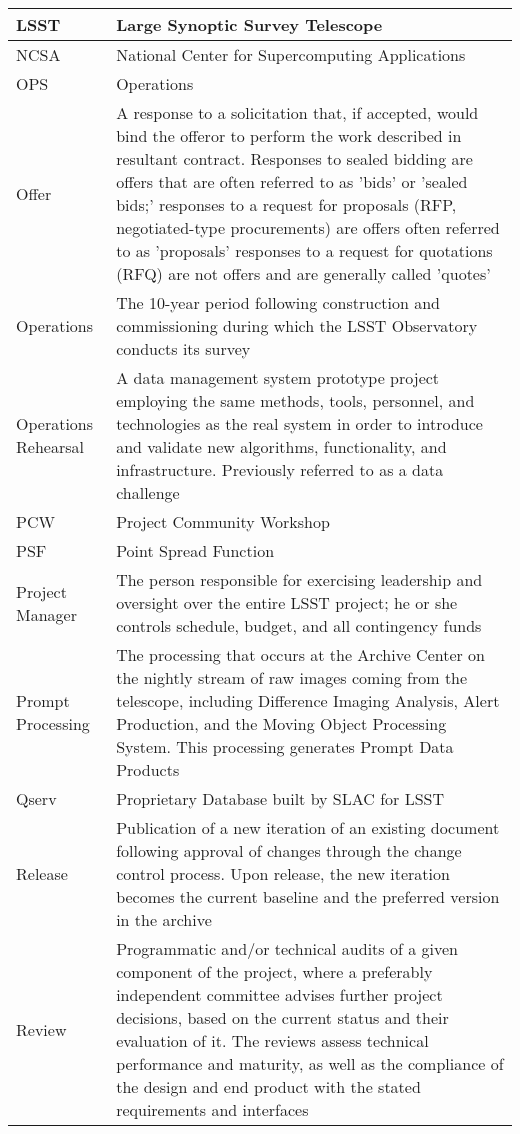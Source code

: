 \begin{longtable}{|p{}|p{}|}
LSST & Large Synoptic Survey Telescope \\\hline
NCSA & National Center for Supercomputing Applications \\\hline
OPS & Operations \\\hline
Offer & A response to a solicitation that, if accepted, would bind the offeror to perform the work described in resultant contract. Responses to sealed bidding are offers that are often referred to as 'bids' or 'sealed bids;' responses to a request for proposals (RFP, negotiated-type procurements) are offers often referred to as 'proposals' responses to a request for quotations (RFQ) are not offers and are generally called 'quotes' \\\hline
Operations & The 10-year period following construction and commissioning during which the LSST Observatory conducts its survey \\\hline
Operations Rehearsal & A data management system prototype project employing the same methods, tools, personnel, and technologies as the real system in order to introduce and validate new algorithms, functionality, and infrastructure. Previously referred to as a data challenge \\\hline
PCW & Project Community Workshop \\\hline
PSF & Point Spread Function \\\hline
Project Manager & The person responsible for exercising leadership and oversight over the entire LSST project; he or she controls schedule, budget, and all contingency funds \\\hline
Prompt Processing & The processing that occurs at the Archive Center on the nightly stream of raw images coming from the telescope, including Difference Imaging Analysis, Alert Production, and the Moving Object Processing System. This processing generates Prompt Data Products \\\hline
Qserv & Proprietary Database built by SLAC for LSST \\\hline
Release & Publication of a new iteration of an existing document following approval of changes through the change control process. Upon release, the new iteration becomes the current baseline and the preferred version in the archive \\\hline
Review & Programmatic and/or technical audits of a given component of the project, where a preferably independent committee advises further project decisions, based on the current status and their evaluation of it. The reviews assess technical performance and maturity, as well as the compliance of the design and end product with the stated requirements and interfaces \\\hline

\end{longtable}
